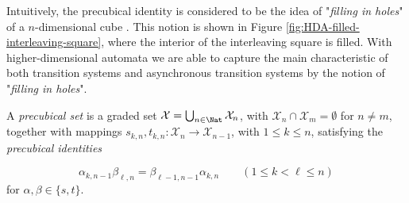     Intuitively, the precubical identity is considered to be the idea of "\emph{filling in holes}" of a $n$-dimensional cube \cite[Section 2]{pratt91hda}. This notion is shown in Figure \ref{fig:HDA-filled-interleaving-square}, where the interior of the interleaving square is filled. With higher-dimensional automata we are able to capture the main characteristic of both transition systems and asynchronous transition systems by the notion of "\emph{filling in holes}".
    
    
    
  
    \begin{definition}
        \label{def:precubical-set}
         A \emph{precubical set} is a graded set $\mathcal{X}= \bigcup_{ n\in \Nat} \mathcal{X}_n$, with $\mathcal{X}_n\cap \mathcal{X}_m= \emptyset$ for $n\ne m$, together with mappings $s_{ k, n}, t_{ k, n}:\mathcal{X}_n\to \mathcal{X}_{ n- 1}$, with $1\leq k\leq n$, satisfying the \emph{precubical identities}
         
        
        \begin{equation*}
            \alpha_{ k, n- 1} \beta_{ \ell, n}= \beta_{ \ell- 1, n- 1} \alpha_{ k, n} \qquad(1 \leq k< \ell \leq n)
        \end{equation*}
        for $\alpha, \beta\in\{ s, t\}$.
    \end{definition}
    

